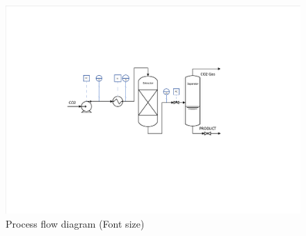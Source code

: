 \documentclass[../Article_Model_Parameters.tex]{subfiles}
\begin{document}
	\begin{figure}[h!]
		\centering
		\includegraphics[width=0.95\columnwidth]{Figures/SFE_PFD_cropped.pdf}
		\caption{Process flow diagram ({\color{red}Font size}) }
		\label{fig: SFE_drawing}
	\end{figure}
	
\end{document}
